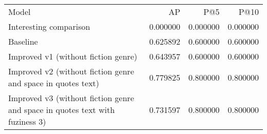 \begin{tabular}{lrrr}
Model & AP & P@5 & P@10 \\
Interesting comparison & 0.000000 & 0.000000 & 0.000000 \\
Baseline & 0.625892 & 0.600000 & 0.600000 \\
Improved v1 (without fiction genre) & 0.643957 & 0.600000 & 0.600000 \\
Improved v2 (without fiction genre and space in quotes text) & 0.779825 & 0.800000 & 0.800000 \\
Improved v3 (without fiction genre and space in quotes text with fuziness 3) & 0.731597 & 0.800000 & 0.800000 \\
\end{tabular}
